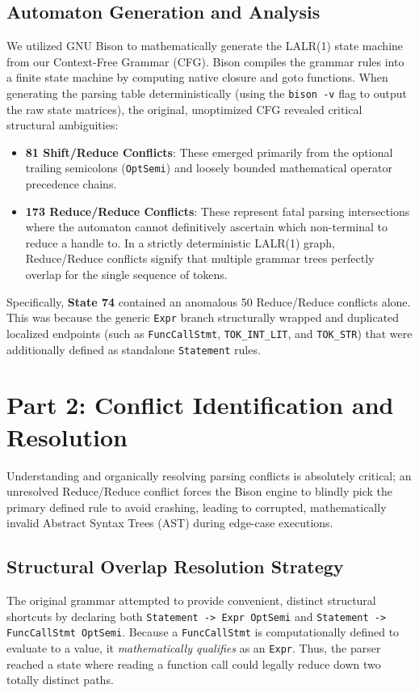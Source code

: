 \documentclass[12pt, a4paper]{article}
\begin{document}
\subsection{Automaton Generation and Analysis}
We utilized GNU Bison to mathematically generate the LALR(1) state machine from our Context-Free Grammar (CFG). Bison compiles the grammar rules into a finite state machine by computing native closure and goto functions. When generating the parsing table deterministically (using the \texttt{bison -v} flag to output the raw state matrices), the original, unoptimized CFG revealed critical structural ambiguities:
\begin{itemize}
    \item \textbf{81 Shift/Reduce Conflicts}: These emerged primarily from the optional trailing semicolons (\texttt{OptSemi}) and loosely bounded mathematical operator precedence chains.
    \item \textbf{173 Reduce/Reduce Conflicts}: These represent fatal parsing intersections where the automaton cannot definitively ascertain which non-terminal to reduce a handle to. In a strictly deterministic LALR(1) graph, Reduce/Reduce conflicts signify that multiple grammar trees perfectly overlap for the single sequence of tokens.
\end{itemize}
Specifically, \textbf{State 74} contained an anomalous 50 Reduce/Reduce conflicts alone. This was because the generic \texttt{Expr} branch structurally wrapped and duplicated localized endpoints (such as \texttt{FuncCallStmt}, \texttt{TOK\_INT\_LIT}, and \texttt{TOK\_STR}) that were additionally defined as standalone \texttt{Statement} rules.

\section{Part 2: Conflict Identification and Resolution}
Understanding and organically resolving parsing conflicts is absolutely critical; an unresolved Reduce/Reduce conflict forces the Bison engine to blindly pick the primary defined rule to avoid crashing, leading to corrupted, mathematically invalid Abstract Syntax Trees (AST) during edge-case executions.

\subsection{Structural Overlap Resolution Strategy}
The original grammar attempted to provide convenient, distinct structural shortcuts by declaring both \texttt{Statement -> Expr OptSemi} and \texttt{Statement -> FuncCallStmt OptSemi}. Because a \texttt{FuncCallStmt} is computationally defined to evaluate to a value, it \textit{mathematically qualifies} as an \texttt{Expr}. Thus, the parser reached a state where reading a function call could legally reduce down two totally distinct paths.
\end{document}
